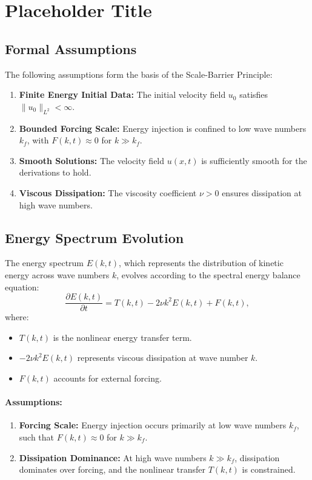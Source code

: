 \section{Placeholder Title}

\subsection{Formal Assumptions}
The following assumptions form the basis of the Scale-Barrier Principle:
\begin{enumerate}
    \item \textbf{Finite Energy Initial Data:} The initial velocity field $u_0$ satisfies $\|u_0\|_{L^2} < \infty$.
    \item \textbf{Bounded Forcing Scale:} Energy injection is confined to low wave numbers $k_f$, with $F(k, t) \approx 0$ for $k \gg k_f$.
    \item \textbf{Smooth Solutions:} The velocity field $u(x, t)$ is sufficiently smooth for the derivations to hold.
    \item \textbf{Viscous Dissipation:} The viscosity coefficient $\nu > 0$ ensures dissipation at high wave numbers.
\end{enumerate}

\subsection{Energy Spectrum Evolution}
The energy spectrum $E(k, t)$, which represents the distribution of kinetic energy across wave numbers $k$, evolves according to the spectral energy balance equation:
\[
\frac{\partial E(k, t)}{\partial t} = T(k, t) - 2\nu k^2 E(k, t) + F(k, t),
\]
where:
\begin{itemize}
    \item $T(k, t)$ is the nonlinear energy transfer term.
    \item $-2\nu k^2 E(k, t)$ represents viscous dissipation at wave number $k$.
    \item $F(k, t)$ accounts for external forcing.
\end{itemize}

\paragraph{Assumptions:}
\begin{enumerate}
    \item \textbf{Forcing Scale:} Energy injection occurs primarily at low wave numbers $k_f$, such that $F(k, t) \approx 0$ for $k \gg k_f$.
    \item \textbf{Dissipation Dominance:} At high wave numbers $k \gg k_f$, dissipation dominates over forcing, and the nonlinear transfer $T(k, t)$ is constrained.
\end{enumerate}

